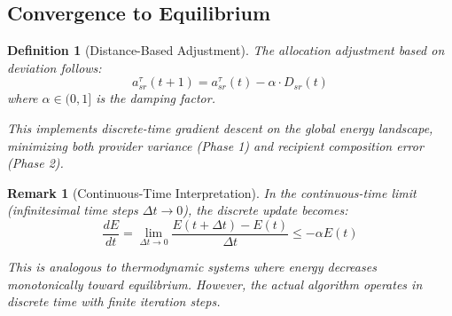 \documentclass[11pt]{article}
\newtheorem{definition}{Definition}
\newtheorem{remark}{Remark}
\begin{document}
\subsection{Convergence to Equilibrium}

\begin{definition}[Distance-Based Adjustment]
The allocation adjustment based on deviation follows:
\[
a_{sr}^{\tau}(t+1) = a_{sr}^{\tau}(t) - \alpha \cdot D_{sr}(t)
\]
where $\alpha \in (0,1]$ is the damping factor.

This implements discrete-time gradient descent on the global energy landscape, minimizing both provider variance (Phase 1) and recipient composition error (Phase 2).
\end{definition}

\begin{remark}[Continuous-Time Interpretation]
In the continuous-time limit (infinitesimal time steps $\Delta t \to 0$), the discrete update becomes:
\[
\frac{dE}{dt} = \lim_{\Delta t \to 0} \frac{E(t + \Delta t) - E(t)}{\Delta t} \leq -\alpha E(t)
\]

This is analogous to thermodynamic systems where energy decreases monotonically toward equilibrium. However, the actual algorithm operates in discrete time with finite iteration steps.
\end{remark}
\end{document}

